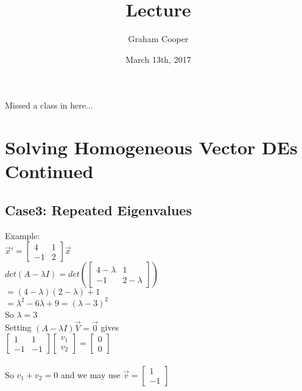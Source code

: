 \documentclass[12pt]{article}
\title{\vspace{-15ex}Lecture\vspace{-1ex}}
\date{March 13th, 2017}
\author{Graham Cooper}
\begin{document}
	\maketitle
	
	Missed a class in here...
	
	\section*{Solving Homogeneous Vector DEs Continued}
	
	\subsection*{Case3: Repeated Eigenvalues}
	Example:\\
	$\overrightarrow{x}' = \begin{bmatrix}
	4 & 1 \\ -1 & 2
	\end{bmatrix} \overrightarrow{x}$\\
	
	$det(A - \lambda I) = det(\begin{bmatrix}
	4 - \lambda & 1 \\ -1 & 2 - \lambda
	\end{bmatrix})$\\
	$= (4-\lambda)(2-\lambda) + 1$\\
	$= \lambda^2 - 6\lambda + 9 = (\lambda - 3)^2$\\
	So $\lambda = 3$\\
	
	Setting $(A - \lambda I)\overrightarrow{V} = \overrightarrow{0}$ gives\\
	$\begin{bmatrix}
	1 & 1 \\ -1 & -1
	\end{bmatrix}
	\begin{bmatrix}
	v_1\\v_2
	\end{bmatrix} = \begin{bmatrix}
	0 \\ 0
	\end{bmatrix}$\\\\
	
	So $v_1 + v_2 = 0$ and we may use $\overrightarrow{v} = \begin{bmatrix}
	1 \\ -1
	\end{bmatrix}$\\
	
\end{document}
